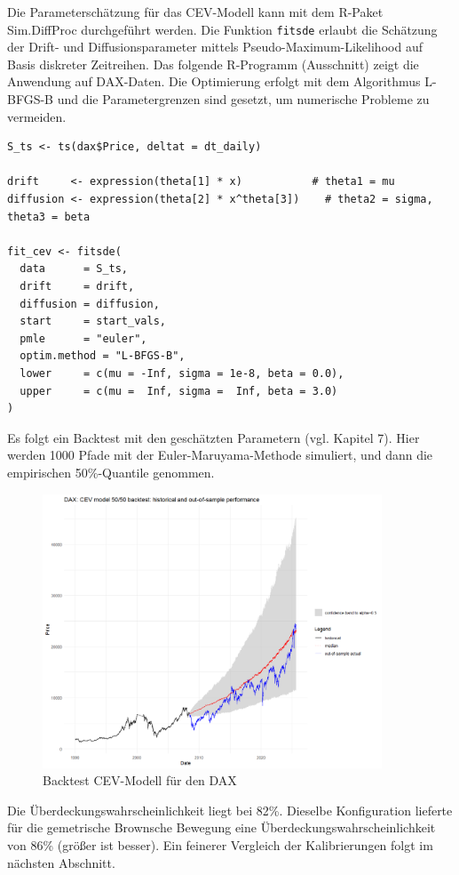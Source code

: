 \begin{bsp}
Die Parameterschätzung für das CEV-Modell kann mit dem R-Paket Sim.DiffProc durchgeführt werden. Die Funktion \texttt{fitsde} erlaubt die Schätzung der Drift- und Diffusionsparameter mittels Pseudo-Maximum-Likelihood auf Basis diskreter Zeitreihen. Das folgende R-Programm (Ausschnitt) zeigt die Anwendung auf DAX-Daten.
Die Optimierung erfolgt mit dem Algorithmus L-BFGS-B und die Parametergrenzen sind gesetzt, um numerische Probleme zu vermeiden.

\begin{lstlisting}
S_ts <- ts(dax$Price, deltat = dt_daily)

drift     <- expression(theta[1] * x)           # theta1 = mu
diffusion <- expression(theta[2] * x^theta[3])    # theta2 = sigma, theta3 = beta

fit_cev <- fitsde(
  data      = S_ts,
  drift     = drift,
  diffusion = diffusion,
  start     = start_vals,
  pmle      = "euler",
  optim.method = "L-BFGS-B",
  lower     = c(mu = -Inf, sigma = 1e-8, beta = 0.0),
  upper     = c(mu =  Inf, sigma =  Inf, beta = 3.0)
)
\end{lstlisting}

Es folgt ein Backtest mit den geschätzten Parametern (vgl. Kapitel 7). Hier werden 1000 Pfade mit der
Euler-Maruyama-Methode simuliert, und dann die empirischen 50\%-Quantile genommen.

\begin{figure}[H]
    \centering
    \includegraphics[width=0.9\textwidth]{images/cev_dax_backtest.png}
    \caption{Backtest CEV-Modell für den DAX}
    \label{fig:cev_dax_backtest}
\end{figure}

Die Überdeckungswahrscheinlichkeit liegt bei 82\%. Dieselbe Konfiguration
lieferte für die gemetrische Brownsche Bewegung eine Überdeckungswahrscheinlichkeit von 86\% (größer ist besser).
Ein feinerer Vergleich der Kalibrierungen folgt im nächsten Abschnitt. 

\end{bsp}

